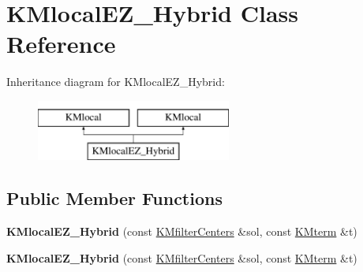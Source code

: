 \hypertarget{class_k_mlocal_e_z___hybrid}{
\section{KMlocalEZ\_\-Hybrid Class Reference}
\label{class_k_mlocal_e_z___hybrid}
}
Inheritance diagram for KMlocalEZ\_\-Hybrid:\begin{figure}[H]
\begin{center}
\leavevmode
\includegraphics[height=2cm]{class_k_mlocal_e_z___hybrid}
\end{center}
\end{figure}
\subsection*{Public Member Functions}
\begin{DoxyCompactItemize}
\item 
\hypertarget{class_k_mlocal_e_z___hybrid_a59f0d7aa96ccb20a7c187ee065b54f33}{
{\bfseries KMlocalEZ\_\-Hybrid} (const \hyperlink{class_k_mfilter_centers}{KMfilterCenters} \&sol, const \hyperlink{class_k_mterm}{KMterm} \&t)}
\label{class_k_mlocal_e_z___hybrid_a59f0d7aa96ccb20a7c187ee065b54f33}

\item 
\hypertarget{class_k_mlocal_e_z___hybrid_a59f0d7aa96ccb20a7c187ee065b54f33}{
{\bfseries KMlocalEZ\_\-Hybrid} (const \hyperlink{class_k_mfilter_centers}{KMfilterCenters} \&sol, const \hyperlink{class_k_mterm}{KMterm} \&t)}
\label{class_k_mlocal_e_z___hybrid_a59f0d7aa96ccb20a7c187ee065b54f33}

\end{DoxyCompactItemize}

